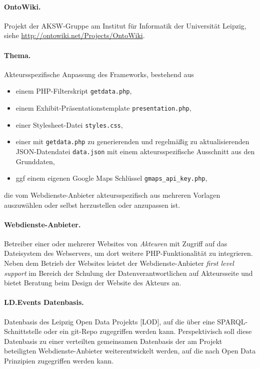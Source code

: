 \documentclass[11pt,a4paper]{article}
\begin{document}
\paragraph{OntoWiki.} 
Projekt der AKSW-Gruppe am Institut für Informatik der Universität Leipzig,
siehe \url{http://ontowiki.net/Projects/OntoWiki}.

\paragraph{Thema.} 
Akteursspezifische Anpassung des Frameworks, bestehend aus 
\begin{itemize}
\item einem PHP-Filterskript \texttt{getdata.php},
\item einem Exhibit-Präsentationstemplate \texttt{presentation.php},
\item einer Stylesheet-Datei \texttt{styles.css},
\item einer mit \texttt{getdata.php} zu generierenden und regelmäßig zu
  aktualisierenden JSON-Datendatei \texttt{data.json} mit einem
  akteursspezifische Ausschnitt aus den Grunddaten,
\item ggf einem eigenen Google Maps Schlüssel \texttt{gmaps\_api\_key.php},
\end{itemize}
die vom Webdienste-Anbieter akteursspezifisch aus mehreren Vorlagen
auszuwählen oder selbst herzustellen oder anzupassen ist.

\paragraph{Webdienste-Anbieter.} 
Betreiber einer oder mehrerer Websites von \emph{Akteuren} mit Zugriff auf das
Dateisystem des Webservers, um dort weitere PHP-Funktionalität zu integrieren.
Neben dem Betrieb der Websites leistet der Webdienste-Anbieter \emph{first
  level support} im Bereich der Schulung der Datenverantwortlichen auf
Akteursseite und bietet Beratung beim Design der Website des Akteurs an.

\paragraph{LD.Events Datenbasis.} 
Datenbasis des Leipzig Open Data Projekts [LOD], auf die über eine
SPARQL-Schnittstelle oder ein git-Repo zugegriffen werden kann.
Perspektivisch soll diese Datenbasis zu einer verteilten gemeinsamen
Datenbasis der am Projekt beteiligten Web\-dienste-Anbieter weiterentwickelt
werden, auf die nach Open Data Prinzipien zugegriffen werden kann.
\end{document}
